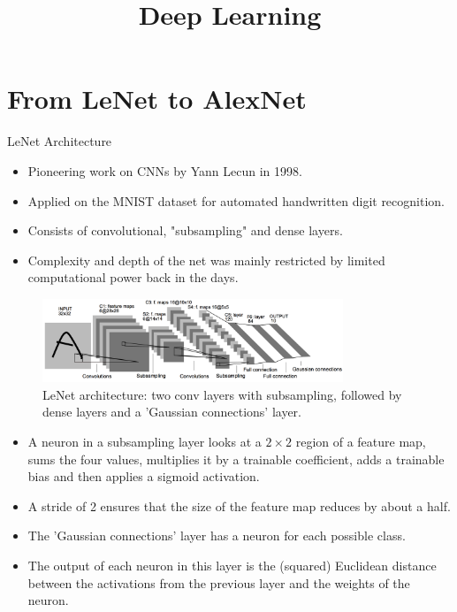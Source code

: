 






\newcommand{\titlefigure}{plots/05_conv_variations/3d/3dconv.png}
\newcommand{\learninggoals}{
  \item 1D Convolutions
  \item 2D Convolutions
  \item 3D Convolutions
}

\title{Deep Learning}
\date{}







\section{From LeNet to AlexNet}

\begin{vbframe}{LeNet Architecture}
  \begin{itemize}
    \item Pioneering work on CNNs by Yann Lecun in 1998. 
    \item Applied on the MNIST dataset for automated handwritten digit recognition.
    \item Consists of convolutional, "subsampling" and dense layers.
    \item Complexity and depth of the net was mainly restricted by limited computational power back in the days.
  \end{itemize}
  \begin{figure}
  \centering
    \includegraphics[width=9cm]{plots/architectures/lenet.png}
    \caption{LeNet architecture: two conv layers with subsampling, followed by dense layers and a 'Gaussian connections' layer.}
  \end{figure}
  \framebreak
  \begin{itemize}
    \item A neuron in a subsampling layer looks at a $2 \times 2$ region of a feature map, sums the four values, multiplies it by a trainable coefficient, adds a trainable bias and then applies a sigmoid activation.
    \item A stride of 2 ensures that the size of the feature map reduces by about a half.
    \item The 'Gaussian connections' layer has a neuron for each possible class. 
    \item The output of each neuron in this layer is the (squared) Euclidean distance between the activations from the previous layer and the weights of the neuron.
  \end{itemize}   
\end{vbframe}


